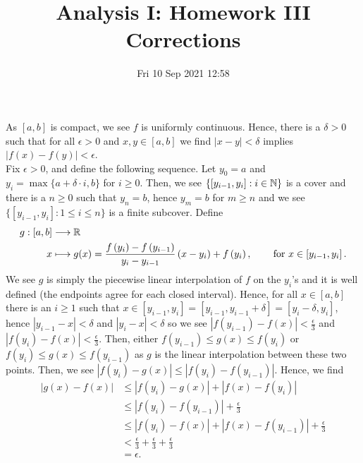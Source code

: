 \documentclass[a4paper]{article}
\title{Analysis I: Homework III Corrections}
\date{Fri 10 Sep 2021 12:58}
\begin{document}
\maketitle
\begin{solution}[18]
	As \(\left[ a, b \right] \) is compact, we see \(f\) is uniformly continuous. Hence, there is a \(\delta > 0\) such that for all \(\epsilon > 0\) and \(x, y \in \left[ a, b \right] \) we find \(\left| x - y \right| < \delta\)  implies \(\left| f\left( x \right)  - f\left( y \right)  \right|  < \epsilon\).\\
	Fix \(\epsilon > 0\), and  define the following sequence. Let \(y_0 = a\) and \(y_{i} = \max \{a + \delta  \cdot i, b\}\) for \(i \ge 0\). Then, we see \(\{\left[ y_{i-1}, y_{i } \right] : i \in \mathbb{N}\} \) is a cover and there is a \(n \ge 0\)  such that \(y_{n} = b\), hence \(y_{m} = b\) for \(m \ge n\) and we see \(\{\left[ y_{i-1}, y_{i} \right] : 1 \le i \le n\} \) is a finite subcover. Define \begin{align*}
		g: \left[ a, b \right]  &\longrightarrow \mathbb{R} \\
		x &\longmapsto g(x) =
				\frac{f\left( y_{i} \right) - f\left( y_{i-1} \right) }{y_{i} - y_{i-1}} \left( x - y_{i} \right) + f\left( y_{i} \right)   , & \quad \text{ for } x \in \left[ y_{i-1}, y_{i} \right]
	.\end{align*}
	We see \(g\) is simply the piecewise linear interpolation of \(f\) on the \(y_{i}\)'s and it is well defined (the endpoints agree for each closed interval). Hence, for all \(x \in \left[ a, b \right] \) there is an \(i\ge 1\) such that \(x \in \left[ y_{i-1}, y_{i} \right]  = \left[ y_{i-1}, y_{i-1} + \delta \right] = \left[ y_{i} - \delta, y_{i} \right]  \), hence \(\left| y_{i-1} - x \right| < \delta\) and \(\left| y_{i} - x \right| < \delta\)  so we see \(\left| f \left( y_{i-1} \right)  - f\left( x \right)  \right| < \frac{\epsilon}{3} \) and \(\left| f\left( y_{i} \right) - f\left( x \right)  \right| < \frac{\epsilon}{3}\). Then, either \(f\left( y_{i-1} \right) \le g\left( x \right) \le f\left( y_{i} \right) \) or \(f\left( y_{i} \right) \le g\left( x \right) \le f\left( y_{i-1} \right) \) as \(g\) is the linear interpolation between these two points. Then, we see \(\left| f\left( y_{i} \right)  - g\left( x \right)  \right| \le \left| f\left( y_{i} \right)  - f\left( y_{i-1} \right)  \right| \). Hence, we find
	\begin{align*}
		\left| g\left( x \right) - f\left( x \right)  \right| &\le \left| f\left( y_{i} \right) - g\left( x \right)  \right|  + \left| f\left( x \right) - f\left( y_{i} \right)  \right| \\
								      &\le \left| f\left( y_{i} \right) - f\left( y_{i-1} \right)  \right|  + \frac{\epsilon}{3}\\
								      &\le \left| f\left( y_{i} \right) - f\left( x \right)  \right|  + \left| f\left( x \right) - f\left( y_{i-1} \right)  \right|  + \frac{\epsilon}{3}\\
								      &< \frac{\epsilon}{3} + \frac{\epsilon}{3} + \frac{\epsilon}{3}\\
								      &= \epsilon
	.\end{align*}
\end{solution}
\end{document}
